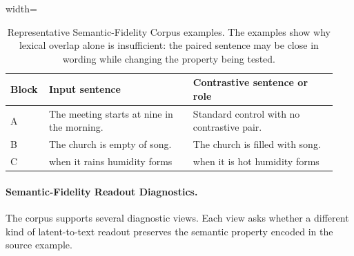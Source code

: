 \documentclass[12pt,a4paper,twoside,openright]{book}
\begin{document}
\begin{table}[!htb]
    \centering
    \small
    \begin{adjustbox}{width=\textwidth}
    \begin{tabular}{p{0.10\linewidth} p{0.42\linewidth} p{0.42\linewidth}}
        \toprule
        \textbf{Block} & \textbf{Input sentence} & \textbf{Contrastive sentence or role} \\
        \midrule
        A &
        The meeting starts at nine in the morning. &
        Standard control with no contrastive pair. \\
        B &
        The church is empty of song. &
        The church is filled with song. \\
        C &
        when it rains humidity forms &
        when it is hot humidity forms \\
        \bottomrule
    \end{tabular}
    \end{adjustbox}
    \caption{Representative Semantic-Fidelity Corpus examples. The examples
    show why lexical overlap alone is insufficient: the paired sentence may be
    close in wording while changing the property being tested.}
    \label{tab:semantic-fidelity-examples}
\end{table}

\paragraph{Semantic-Fidelity Readout Diagnostics.}
\label{sec:method-readout-diagnostics}

The corpus supports several diagnostic views. Each view asks whether a different
kind of latent-to-text readout preserves the semantic property encoded in the
source example.
\end{document}
